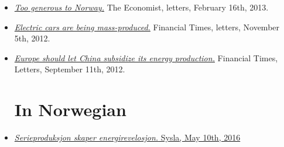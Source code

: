 \documentclass[margin]{res}
\begin{document}
\begin{resume}
\begin{itemize}
\item[] \href{http://www.economist.com/news/letters/21571848-nordic-countries-private-schools-immigration-sandhurst-ed-koch-richard-iii}{\emph{Too generous to Norway.}} The Economist, letters, February 16th, 2013.

\item[] \href{http://www.ft.com/intl/cms/s/0/26168da6-238d-11e2-bb86-00144feabdc0.html#axzz2sclP2DP5}{\emph{Electric cars are being mass-produced.}}  Financial Times, letters, November 5th, 2012.

\item[] \href{http://www.ft.com/intl/cms/s/0/553d8cf6-fb56-11e1-87ae-00144feabdc0.html#axzz2sclP2DP5}{\emph{Europe should let China subsidize its energy production.}}  Financial Times, Letters, September 11th, 2012.


\normalsize{\section{In Norwegian}}

\item[] \href{http://syslagronn.no/2016/05/12/syslagronn/serieproduksjon-skaper-energirevolusjon_87844/.VzQ1IfhgWKc.twitter}{\emph{Serieproduksjon skaper energirevelosjon.} Sysla, May 10th, 2016}


\end{itemize}
\end{resume}
\end{document}
